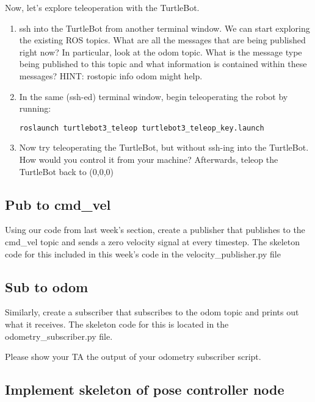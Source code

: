 \documentclass{article}
\begin{document}
Now, let's explore teleoperation with the TurtleBot.

\begin{enumerate}
\item ssh into the TurtleBot from another terminal window. We can start exploring the existing ROS topics. What are all the messages that are being published right now? In particular, look at the odom topic. What is the message type being published to this topic and what information is contained within these messages? HINT: rostopic info odom might help.	
\item In the same (ssh-ed) terminal window, begin teleoperating the robot by running:
\begin{lstlisting}
roslaunch turtlebot3_teleop turtlebot3_teleop_key.launch
\end{lstlisting}
\item Now try teleoperating the TurtleBot, but without ssh-ing into the TurtleBot. How would you control it from your machine? Afterwards, teleop the TurtleBot back to (0,0,0)
\end{enumerate}

\subsection{Pub to cmd\_vel}
Using our code from last week's section, create a publisher that publishes to the cmd\_vel topic and sends a zero velocity signal at every timestep. The skeleton code for this included in this week's code in the velocity\_publisher.py file
\subsection{Sub to odom}
Similarly, create a subscriber that subscribes to the odom topic and prints out what it receives. The skeleton code for this is located in the odometry\_subscriber.py file.


Please show your TA the output of your odometry subscriber script.
\subsection{Implement skeleton of pose controller node}
\end{document}
